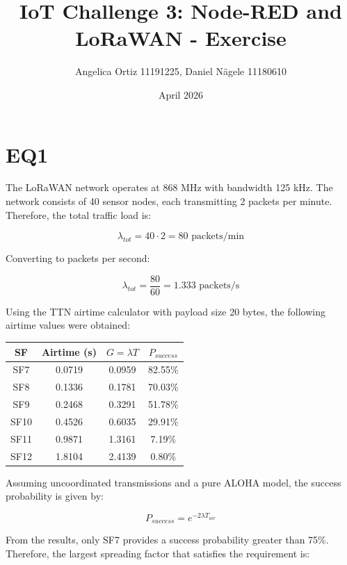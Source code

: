 \documentclass{article}
\title{IoT Challenge 3: Node-RED and LoRaWAN - Exercise}
\author{Angelica Ortiz 11191225, Daniel Nägele 11180610}
\date{April 2026}
\begin{document}
\maketitle
\thispagestyle{empty}
\newpage

\tableofcontents
\newpage


\section{EQ1}

The LoRaWAN network operates at 868 MHz with bandwidth 125 kHz. The network consists of 40 sensor nodes, each transmitting 2 packets per minute. Therefore, the total traffic load is:

\begin{equation}
\lambda_{tot} = 40 \cdot 2 = 80 \text{ packets/min}
\end{equation}

Converting to packets per second:

\begin{equation}
\lambda_{tot} = \frac{80}{60} = 1.333 \text{ packets/s}
\end{equation}

Using the TTN airtime calculator with payload size 20 bytes, the following airtime values were obtained:

\begin{center}
\begin{tabular}{cccc}
\toprule
SF & Airtime (s) & $G = \lambda T$ & $P_{success}$ \\
\midrule
SF7  & 0.0719 & 0.0959 & 82.55\% \\
SF8  & 0.1336 & 0.1781 & 70.03\% \\
SF9  & 0.2468 & 0.3291 & 51.78\% \\
SF10 & 0.4526 & 0.6035 & 29.91\% \\
SF11 & 0.9871 & 1.3161 & 7.19\% \\
SF12 & 1.8104 & 2.4139 & 0.80\% \\
\bottomrule
\end{tabular}
\end{center}

Assuming uncoordinated transmissions and a pure ALOHA model, the success probability is given by:

\begin{equation}
P_{success} = e^{-2\lambda T_{air}}
\end{equation}

From the results, only SF7 provides a success probability greater than 75\%. Therefore, the largest spreading factor that satisfies the requirement is:
\end{document}
